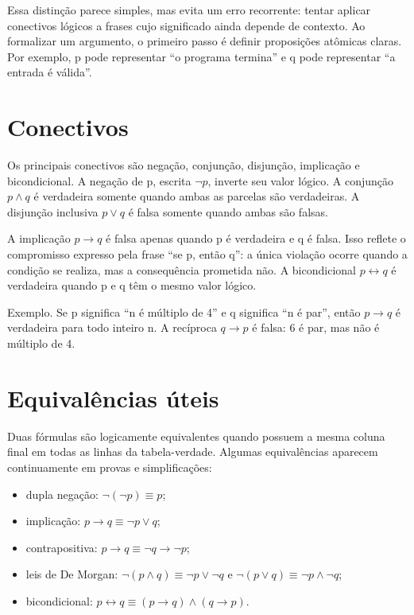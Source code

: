 \documentclass[12pt,a4paper,openany]{book}
\begin{document}
Essa distinção parece simples, mas evita um erro recorrente: tentar aplicar conectivos lógicos a frases cujo significado ainda depende de contexto. Ao formalizar um argumento, o primeiro passo é definir proposições atômicas claras. Por exemplo, p pode representar “o programa termina” e q pode representar “a entrada é válida”.



\section{Conectivos}



Os principais conectivos são negação, conjunção, disjunção, implicação e bicondicional. A negação de p, escrita $\neg p$, inverte seu valor lógico. A conjunção $p\land q$ é verdadeira somente quando ambas as parcelas são verdadeiras. A disjunção inclusiva $p\lor q$ é falsa somente quando ambas são falsas.



A implicação $p\to q$ é falsa apenas quando p é verdadeira e q é falsa. Isso reflete o compromisso expresso pela frase “se p, então q”: a única violação ocorre quando a condição se realiza, mas a consequência prometida não. A bicondicional $p\leftrightarrow q$ é verdadeira quando p e q têm o mesmo valor lógico.



\begin{exemplo}{Exemplo.}
Se p significa “n é múltiplo de 4” e q significa “n é par”, então $p\to q$ é verdadeira para todo inteiro n. A recíproca $q\to p$ é falsa: 6 é par, mas não é múltiplo de 4.
\end{exemplo}



\section{Equivalências úteis}



Duas fórmulas são logicamente equivalentes quando possuem a mesma coluna final em todas as linhas da tabela-verdade. Algumas equivalências aparecem continuamente em provas e simplificações:



\begin{itemize}
\item dupla negação: $\neg(\neg p)\equiv p$;
\item implicação: $p\to q\equiv\neg p\lor q$;
\item contrapositiva: $p\to q\equiv\neg q\to\neg p$;
\item leis de De Morgan: $\neg(p\land q)\equiv\neg p\lor\neg q$ e $\neg(p\lor q)\equiv\neg p\land\neg q$;
\item bicondicional: $p\leftrightarrow q\equiv(p\to q)\land(q\to p)$.
\end{itemize}
\end{document}
